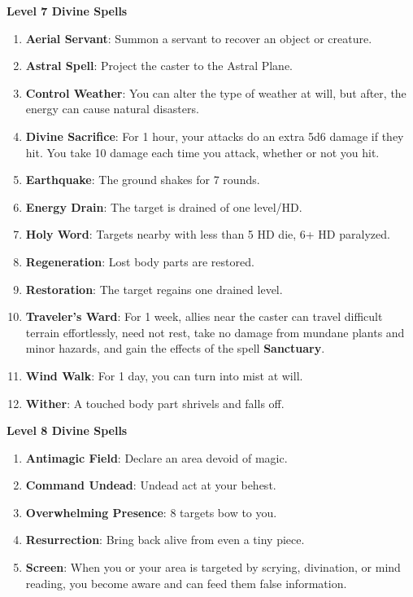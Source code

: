 \documentclass[twoside]{article}
\begin{document}
\textbf{Level 7 Divine Spells}
\begin{enumerate}[nosep]
\item \textbf{Aerial Servant}: Summon a servant to recover an object or creature.
\item \textbf{Astral Spell}: Project the caster to the Astral Plane.
\item \textbf{Control Weather}: You can alter the type of weather at will, but after, the energy can cause natural disasters.
\item \textbf{Divine Sacrifice}: For 1 hour, your attacks do an extra 5d6 damage if they hit. You take 10 damage each time you attack, whether or not you hit.
\item \textbf{Earthquake}: The ground shakes for 7 rounds.
\item \textbf{Energy Drain}: The target is drained of one level/HD.
\item \textbf{Holy Word}: Targets nearby with less than 5 HD die, 6+ HD paralyzed.
\item \textbf{Regeneration}: Lost body parts are restored.
\item \textbf{Restoration}: The target regains one drained level.
\item \textbf{Traveler's Ward}: For 1 week, allies near the caster can travel difficult terrain effortlessly, need not rest, take no damage from mundane plants and minor hazards, and gain the effects of the spell \textbf{Sanctuary}.
\item \textbf{Wind Walk}: For 1 day, you can turn into mist at will.
\item \textbf{Wither}: A touched body part shrivels and falls off.
\end{enumerate}

\textbf{Level 8 Divine Spells}
\begin{enumerate}[nosep]
\item \textbf{Antimagic Field}: Declare an area devoid of magic.
\item \textbf{Command Undead}: Undead act at your behest.
\item \textbf{Overwhelming Presence}: 8 targets bow to you.
\item \textbf{Resurrection}: Bring back alive from even a tiny piece.
\item \textbf{Screen}: When you or your area is targeted by scrying, divination, or mind reading, you become aware and can feed them false information.
\end{enumerate}
\end{document}
